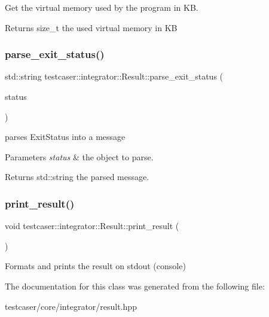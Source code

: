 Get the virtual memory used by the program in KB. 

\begin{DoxyReturn}{Returns}
size\+\_\+t the used virtual memory in KB 
\end{DoxyReturn}
\mbox{\label{classtestcaser_1_1integrator_1_1Result_a8803ea04076142e32e6784f0324b7186}} 
\subsubsection{\texorpdfstring{parse\_exit\_status()}{parse\_exit\_status()}}
{\footnotesize\ttfamily std\+::string testcaser\+::integrator\+::\+Result\+::parse\+\_\+exit\+\_\+status (\begin{DoxyParamCaption}\item[{\mbox{\hyperlink{namespacetestcaser_1_1integrator_a68fcfdfd3f063954e9fd1a94f4b4f755}{testcaser\+::integrator\+::\+Exit\+Status}}}]{status }\end{DoxyParamCaption})\hspace{0.3cm}{\ttfamily [inline]}}



parses Exit\+Status into a message 


\begin{DoxyParams}{Parameters}
{\em status} & the object to parse. \\
\hline
\end{DoxyParams}
\begin{DoxyReturn}{Returns}
std\+::string the parsed message. 
\end{DoxyReturn}
\mbox{\label{classtestcaser_1_1integrator_1_1Result_a941ae470ca06388faff84e0a3bf3e5e0}} 
\subsubsection{\texorpdfstring{print\_result()}{print\_result()}}
{\footnotesize\ttfamily void testcaser\+::integrator\+::\+Result\+::print\+\_\+result (\begin{DoxyParamCaption}{ }\end{DoxyParamCaption})\hspace{0.3cm}{\ttfamily [inline]}}



Formats and prints the result on stdout (console) 



The documentation for this class was generated from the following file\+:\begin{DoxyCompactItemize}
\item 
testcaser/core/integrator/result.\+hpp\end{DoxyCompactItemize}
